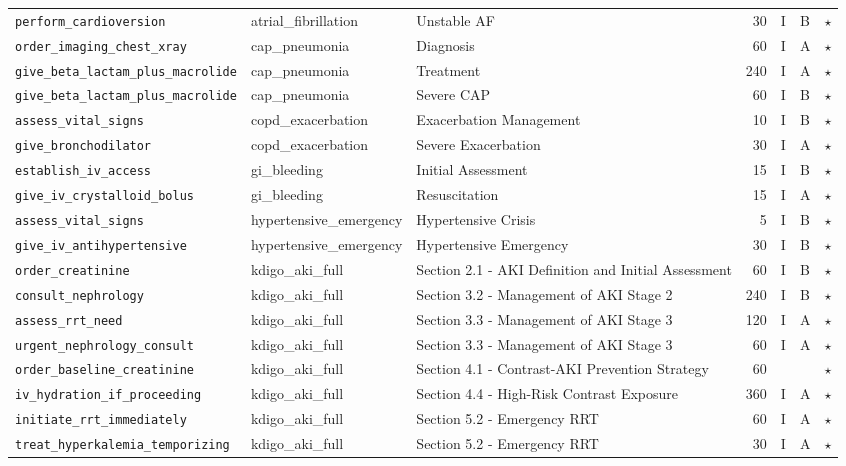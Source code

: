 \begin{longtable}{lllrcll}
\texttt{perform\_cardioversion} & atrial\_fibrillation & Unstable AF & 30 & I & B & $\star$ \\
\texttt{order\_imaging\_chest\_xray} & cap\_pneumonia & Diagnosis & 60 & I & A & $\star$ \\
\texttt{give\_beta\_lactam\_plus\_macrolide} & cap\_pneumonia & Treatment & 240 & I & A & $\star$ \\
\texttt{give\_beta\_lactam\_plus\_macrolide} & cap\_pneumonia & Severe CAP & 60 & I & B & $\star$ \\
\texttt{assess\_vital\_signs} & copd\_exacerbation & Exacerbation Management & 10 & I & B & $\star$ \\
\texttt{give\_bronchodilator} & copd\_exacerbation & Severe Exacerbation & 30 & I & A & $\star$ \\
\texttt{establish\_iv\_access} & gi\_bleeding & Initial Assessment & 15 & I & B & $\star$ \\
\texttt{give\_iv\_crystalloid\_bolus} & gi\_bleeding & Resuscitation & 15 & I & A & $\star$ \\
\texttt{assess\_vital\_signs} & hypertensive\_emergency & Hypertensive Crisis & 5 & I & B & $\star$ \\
\texttt{give\_iv\_antihypertensive} & hypertensive\_emergency & Hypertensive Emergency & 30 & I & B & $\star$ \\
\texttt{order\_creatinine} & kdigo\_aki\_full & Section 2.1 - AKI Definition and Initial Assessment & 60 & I & B & $\star$ \\
\texttt{consult\_nephrology} & kdigo\_aki\_full & Section 3.2 - Management of AKI Stage 2 & 240 & I & B & $\star$ \\
\texttt{assess\_rrt\_need} & kdigo\_aki\_full & Section 3.3 - Management of AKI Stage 3 & 120 & I & A & $\star$ \\
\texttt{urgent\_nephrology\_consult} & kdigo\_aki\_full & Section 3.3 - Management of AKI Stage 3 & 60 & I & A & $\star$ \\
\texttt{order\_baseline\_creatinine} & kdigo\_aki\_full & Section 4.1 - Contrast-AKI Prevention Strategy & 60 &  &  & $\star$ \\
\texttt{iv\_hydration\_if\_proceeding} & kdigo\_aki\_full & Section 4.4 - High-Risk Contrast Exposure & 360 & I & A & $\star$ \\
\texttt{initiate\_rrt\_immediately} & kdigo\_aki\_full & Section 5.2 - Emergency RRT & 60 & I & A & $\star$ \\
\texttt{treat\_hyperkalemia\_temporizing} & kdigo\_aki\_full & Section 5.2 - Emergency RRT & 30 & I & A & $\star$ \\

\end{longtable}
